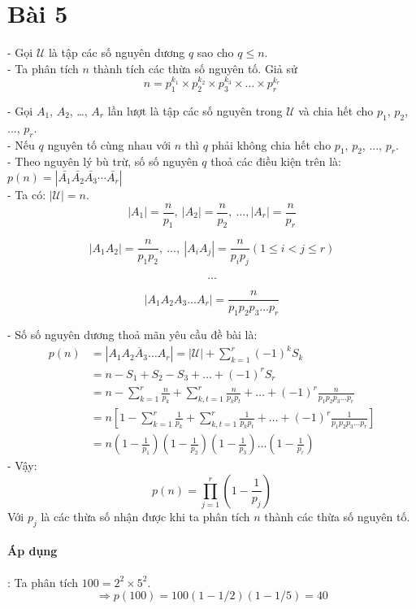 \documentclass[main.tex]{subfiles}
\begin{document}
\section{Bài 5}
\newcommand{\U}{$\mathcal U$ }
\newcommand{\A}[1]{$A_{#1}$}
\newcommand{\abs}[1]{\left|#1\right|}
\newcommand{\ssum}[3]{\sum_{#1}^{#2}{#3}}

- Gọi \U là tập các số nguyên dương $q$ sao cho $q \le n$.\\
- Ta phân tích $n$ thành tích các thừa số nguyên tố. Giả sử
$$
n = p_1^{k_1} \times p_2^{k_2} \times p_3^{k_3} \times \dots \times p_r^{k_r} 
$$

- Gọi \A 1, \A 2, \dots, \A r lần lượt là tập các số nguyên trong \U  và chia hết cho $p_1$, $p_2$, ..., $p_r$.\\
- Nếu $q$ nguyên tố cùng nhau với $n$ thì $q$ phải không chia hết cho $p_1$, $p_2$, ..., $p_r$.\\
- Theo nguyên lý bù trừ, số số nguyên $q$ thoả các điều kiện trên là: $p(n) = \left|\bar{A_1}\bar{A_2}\bar{A_3}\cdots\bar{A_r}\right|$\\
- Ta có: $\abs{\mathcal U} = n$.\\
$$
\abs{A_1}=\frac{n}{p_1},\ \abs{A_2}=\frac{n}{p_2},\ \dots, \abs{A_r}=\frac{n}{p_r} 
$$

$$
\abs{A_1A_2}=\frac{n}{p_1p_2},\ \dots,\ \abs{A_iA_j}=\frac{n}{p_ip_j} (1 \le i < j \le r)
$$

$$
\dots
$$

$$
\abs{A_1A_2A_3 \dots A_r}=\frac{n}{p_1p_2p_3\dots p_r}
$$

- Số số nguyên dương thoả mãn yêu cầu đề bài là:
\begin{align*}
p(n) &= \abs{\overline{A_1A_2A_3 \dots A_r}}=\abs{\mathcal U} + \sum^{r}_{k=1}(-1)^kS_k \\ 
&= n - S_1 + S_2 - S_3 + \dots + (-1)^rS_r \\
&= n - \ssum{k=1}{r}{\frac{n}{p_k}} + \ssum{k,t=1}{r}{\frac{n}{p_kp_t}} + \dots + (-1)^r\frac{n}{p_1p_2p_3\dots p_r} \\
&= n \left[ 1 - \ssum{k=1}{r}{\frac{1}{p_k}} + \ssum{k,t=1}{r}{\frac{1}{p_kp_t}} + \dots + (-1)^r\frac{1}{p_1p_2p_3\dots p_r} \right]\\
&= n\left(1-\frac{1}{p_1}\right)\left(1-\frac{1}{p_2}\right)\left(1-\frac{1}{p_3}\right)\dots\left(1-\frac{1}{p_r}\right)
\end{align*}
- Vậy: 
$$
p(n) = \prod_{j=1}^{r}\left(1-\frac{1}{p_j}\right)
$$
Với $p_j$ là các thừa số nhận được khi ta phân tích $n$ thành các thừa số nguyên tố.

\paragraph*{Áp dụng}:
Ta phân tích $100=2^2\times 5^2$.
$$
\Rightarrow p(100)=100(1-1/2)(1-1/5)=40
$$
\end{document}
